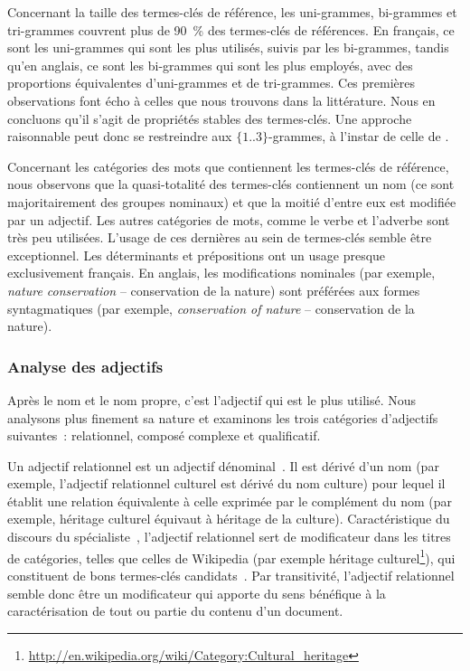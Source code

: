       Concernant la taille des termes-clés de référence, les uni-grammes,
      bi-grammes et tri-grammes couvrent plus de 90~\% des termes-clés de
      références. En français, ce sont les uni-grammes qui sont les plus
      utilisés, suivis par les bi-grammes, tandis qu'en anglais, ce sont les
      bi-grammes qui sont les plus employés, avec des proportions équivalentes
      d'uni-grammes et de tri-grammes. Ces premières observations font écho à
      celles que nous trouvons dans la littérature. Nous en concluons qu'il
      s'agit de propriétés stables des termes-clés. Une approche raisonnable peut
      donc se restreindre aux $\{1..3\}$-grammes, à l'instar de celle de
      .

      Concernant les catégories des mots que contiennent les termes-clés de
      référence, nous observons que la quasi-totalité des termes-clés
      contiennent un nom (ce sont majoritairement des groupes nominaux) et
      que la moitié d'entre eux est modifiée par un adjectif. Les autres
      catégories de mots, comme le verbe et l'adverbe sont très peu utilisées.
      L'usage de ces dernières au sein de termes-clés semble être exceptionnel.
      Les déterminants et prépositions ont un usage presque exclusivement
      français. En anglais, les modifications nominales (par exemple,
      \textit{\og{}nature conservation\fg{}} -- \og{}conservation de la
      nature\fg{}) sont préférées aux formes syntagmatiques (par exemple,
      \textit{\og{}conservation of nature\fg{}} -- \og{}conservation de la
      nature\fg{}).

      \subsubsection{Analyse des adjectifs}
      \label{subsubsec:main:domain_independent_keyphrase_extraction-keyphrase_candidate_selection-analysis_of_keyphrase_properties-adjective_analysis}
      Après le nom et le nom propre, c'est l'adjectif qui est le plus utilisé.
      Nous analysons plus finement sa nature et examinons les trois catégories
      d'adjectifs suivantes~: relationnel, composé complexe et qualificatif.
      
      Un adjectif relationnel est un adjectif
      dénominal~\cite{bally1944linguistiquegeneraleetlinguistiquefrancaise}. Il
      est dérivé d'un nom (par exemple, l'adjectif relationnel
      \og{}culturel\fg{} est dérivé du nom \og{}culture\fg{}) pour lequel il
      établit une relation équivalente à celle exprimée par le complément du nom
      (par exemple, \og{}héritage culturel\fg{} équivaut à \og{}héritage de la
      culture\fg{}). Caractéristique du discours du
      spécialiste~\cite{maniez2009denominaladjectives}, l'adjectif relationnel
      sert de modificateur dans les titres de catégories, telles que celles de
      Wikipedia (par exemple \og{}héritage
      culturel\fg{}\footnote{\url{http://en.wikipedia.org/wiki/Category:Cultural_heritage}}),
      qui constituent de bons termes-clés
      candidats~\cite{medelyan2008smalltrainingset,eichler2010keywe}. Par
      transitivité, l'adjectif relationnel semble donc être un modificateur qui
      apporte du sens bénéfique à la caractérisation  de tout ou partie du
      contenu d'un document.
      
